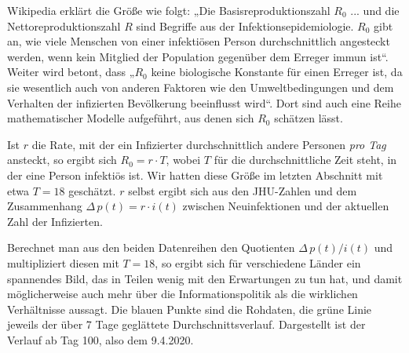 \documentclass[a4paper,11pt]{article}
\newcommand{\m}{\cdot}
\begin{document}
Wikipedia erklärt die Größe wie folgt: „Die Basisreproduktionszahl $R_0$
... und die Nettoreproduktionszahl $R$ sind Begriffe aus der
Infektionsepidemiologie.  $R_0$ gibt an, wie viele Menschen von einer
infektiösen Person durchschnittlich angesteckt werden, wenn kein Mitglied der
Population gegenüber dem Erreger immun ist“. Weiter wird betont, dass „$R_0$
keine biologische Konstante für einen Erreger ist, da sie wesentlich auch von
anderen Faktoren wie den Umweltbedingungen und dem Verhalten der infizierten
Bevölkerung beeinflusst wird“.  Dort sind auch eine Reihe mathematischer
Modelle aufgeführt, aus denen sich $R_0$ schätzen lässt.

Ist $r$ die Rate, mit der ein Infizierter durchschnittlich andere Personen
\emph{pro Tag} ansteckt, so ergibt sich $R_0=r\m T$, wobei $T$ für die
durchschnittliche Zeit steht, in der eine Person infektiös ist. Wir  hatten
diese Größe im letzten Abschnitt mit etwa $T=18$ geschätzt. $r$ selbst ergibt
sich aus den JHU-Zahlen und dem Zusammenhang $\Delta\,p(t)=r\m i(t)$ zwischen
Neuinfektionen und der aktuellen Zahl der Infizierten.  

Berechnet man aus den beiden Datenreihen den Quotienten $\Delta\,p(t)/i(t)$
und multipliziert diesen mit $T=18$, so ergibt sich für verschiedene Länder
ein spannendes Bild, das in Teilen wenig mit den Erwartungen zu tun hat, und
damit möglicherweise auch mehr über die Informationspolitik als die wirklichen
Verhältnisse aussagt.  Die blauen Punkte sind die Rohdaten, die grüne Linie
jeweils der über 7 Tage geglättete Durchschnittsverlauf. Dargestellt ist der
Verlauf ab Tag 100, also dem 9.4.2020.
\end{document}
